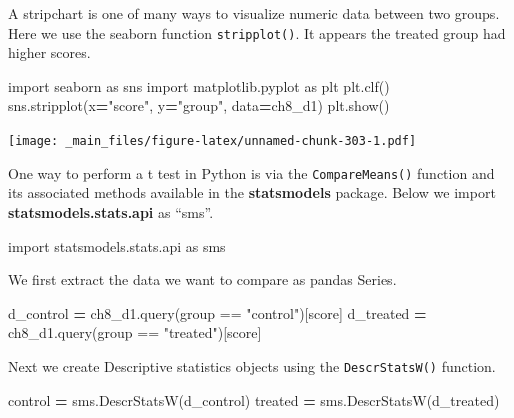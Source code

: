 \documentclass[
]{book}
\newenvironment{Shaded}{\begin{snugshade}}{\end{snugshade}}
\newcommand{\ImportTok}[1]{#1}
\newcommand{\NormalTok}[1]{#1}
\newcommand{\OperatorTok}[1]{\textcolor[rgb]{0.81,0.36,0.00}{\textbf{#1}}}
\newcommand{\StringTok}[1]{\textcolor[rgb]{0.31,0.60,0.02}{#1}}
\begin{document}
A stripchart is one of many ways to visualize numeric data between two groups. Here we use the seaborn function \texttt{stripplot()}. It appears the treated group had higher scores.

\begin{Shaded}
\begin{Highlighting}[]
\ImportTok{import}\NormalTok{ seaborn }\ImportTok{as}\NormalTok{ sns}
\ImportTok{import}\NormalTok{ matplotlib.pyplot }\ImportTok{as}\NormalTok{ plt}
\NormalTok{plt.clf()}
\NormalTok{sns.stripplot(x}\OperatorTok{=}\StringTok{"score"}\NormalTok{, y}\OperatorTok{=}\StringTok{"group"}\NormalTok{, data}\OperatorTok{=}\NormalTok{ch8\_d1)}
\NormalTok{plt.show()}
\end{Highlighting}
\end{Shaded}

\texttt{[image: \_main\_files/figure-latex/unnamed-chunk-303-1.pdf]}

One way to perform a t test in Python is via the \texttt{CompareMeans()} function and its associated methods available in the \textbf{statsmodels} package. Below we import \textbf{statsmodels.stats.api} as ``sms''.

\begin{Shaded}
\begin{Highlighting}[]
\ImportTok{import}\NormalTok{ statsmodels.stats.api }\ImportTok{as}\NormalTok{ sms}
\end{Highlighting}
\end{Shaded}

We first extract the data we want to compare as pandas Series.

\begin{Shaded}
\begin{Highlighting}[]
\NormalTok{d\_control }\OperatorTok{=}\NormalTok{ ch8\_d1.query(}\StringTok{\textquotesingle{}group == "control"\textquotesingle{}}\NormalTok{)[}\StringTok{\textquotesingle{}score\textquotesingle{}}\NormalTok{]}
\NormalTok{d\_treated }\OperatorTok{=}\NormalTok{ ch8\_d1.query(}\StringTok{\textquotesingle{}group == "treated"\textquotesingle{}}\NormalTok{)[}\StringTok{\textquotesingle{}score\textquotesingle{}}\NormalTok{]}
\end{Highlighting}
\end{Shaded}

Next we create Descriptive statistics objects using the \texttt{DescrStatsW()} function.

\begin{Shaded}
\begin{Highlighting}[]
\NormalTok{control }\OperatorTok{=}\NormalTok{ sms.DescrStatsW(d\_control)}
\NormalTok{treated }\OperatorTok{=}\NormalTok{ sms.DescrStatsW(d\_treated)}
\end{Highlighting}
\end{Shaded}
\end{document}

